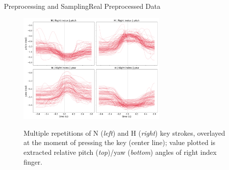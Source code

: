 \begin{frame}{Preprocessing and Sampling}{Real Preprocessed Data}
    \vspace{-1em}
    \begin{figure}
        \includegraphics[width=0.65\textwidth]{../common/images/plot-samples-2x2}
        \label{fig:our_data}
        \caption{Multiple repetitions of N (\emph{left}) and H (\emph{right})
        key strokes, overlayed at the moment of pressing the key (center line);
        value plotted is extracted relative pitch (\emph{top})/yaw
        (\emph{bottom}) angles of right index finger.}
    \end{figure}

\end{frame}


